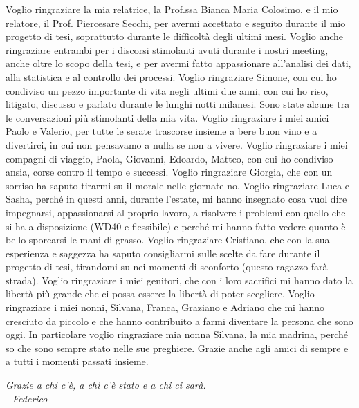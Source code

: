 Voglio ringraziare la mia relatrice, la Prof.ssa Bianca Maria Colosimo, e il mio relatore, il Prof. Piercesare Secchi, per avermi accettato e seguito durante il mio progetto di tesi, soprattutto durante le difficoltà degli ultimi mesi. Voglio anche ringraziare entrambi per i discorsi stimolanti avuti durante i nostri meeting, anche oltre lo scopo della tesi, e per avermi fatto appassionare all'analisi dei dati, alla statistica e al controllo dei processi. Voglio ringraziare Simone, con cui ho condiviso un pezzo importante di vita negli ultimi due anni, con cui ho riso, litigato, discusso e parlato durante le lunghi notti milanesi. Sono state alcune tra le conversazioni più stimolanti della mia vita. Voglio ringraziare i miei amici Paolo e Valerio, per tutte le serate trascorse insieme a bere buon vino e a divertirci, in cui non pensavamo a nulla se non a vivere. Voglio ringraziare i miei compagni di viaggio, Paola, Giovanni, Edoardo, Matteo, con cui ho condiviso ansia, corse contro il tempo e successi. Voglio ringraziare Giorgia, che con un sorriso ha saputo tirarmi su il morale nelle giornate no. Voglio ringraziare Luca e Sasha, perché in questi anni, durante l'estate, mi hanno insegnato cosa vuol dire impegnarsi, appassionarsi al proprio lavoro, a risolvere i problemi con quello che si ha a disposizione (WD40 e flessibile) e perché mi hanno fatto vedere quanto è bello sporcarsi le mani di grasso. Voglio ringraziare Cristiano, che con la sua esperienza e saggezza ha saputo consigliarmi sulle scelte da fare durante il progetto di tesi, tirandomi su nei momenti di sconforto (questo ragazzo farà strada). Voglio ringraziare i miei genitori, che con i loro sacrifici mi hanno dato la libertà più grande che ci possa essere: la libertà di poter scegliere. Voglio ringraziare i miei nonni, Silvana, Franca, Graziano e Adriano che mi hanno cresciuto da piccolo e che hanno contribuito a farmi diventare la persona che sono oggi. In particolare voglio ringraziare mia nonna Silvana, la mia madrina, perché so che sono sempre stato nelle sue preghiere. Grazie anche agli amici di sempre e a tutti i momenti passati insieme.
\vspace{0.8cm}
\begin{flushright}
    \begin{minipage}{0.5\textwidth}
        \small
        \textit{Grazie a chi c'è, a chi c'è stato e a chi ci sarà.}\\
        \hfill \textit{- Federico}
    \end{minipage}
\end{flushright}